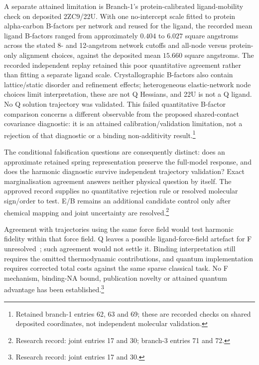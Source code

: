 \documentclass{article}
\begin{document}
A separate attained limitation is Branch-1's protein-calibrated ligand-mobility check on deposited 2ZC9/22U. With one no-intercept scale fitted to protein alpha-carbon B-factors per network and reused for the ligand, the recorded mean ligand B-factors ranged from approximately \(0.404\) to \(6.027\) square angstroms across the stated 8- and 12-angstrom network cutoffs and all-node versus protein-only alignment choices, against the deposited mean \(15.660\) square angstroms. The recorded independent replay retained this poor quantitative agreement rather than fitting a separate ligand scale. Crystallographic B-factors also contain lattice/static disorder and refinement effects; heterogeneous elastic-network node choices limit interpretation, these are not Q Hessians, and 22U is not a Q ligand. No Q solution trajectory was validated. This failed quantitative B-factor comparison concerns a different observable from the proposed shared-contact covariance diagnostic: it is an attained calibration/validation limitation, not a rejection of that diagnostic or a binding non-additivity result.\footnote{Retained branch-1 entries 62, 63 and 69; these are recorded checks on shared deposited coordinates, not independent molecular validation.}

The conditional falsification questions are consequently distinct: does an approximate retained spring representation preserve the full-model response, and does the harmonic diagnostic survive independent trajectory validation? Exact marginalisation agreement answers neither physical question by itself. The approved record supplies no quantitative rejection rule or resolved molecular sign/order to test. E/B remains an additional candidate control only after chemical mapping and joint uncertainty are resolved.\footnote{Research record: joint entries 17 and 30; branch-3 entries 71 and 72.}

Agreement with trajectories using the same force field would test harmonic fidelity within that force field. Q leaves a possible ligand-force-field artefact for F unresolved~\cite{Q}; such agreement would not settle it. Binding interpretation still requires the omitted thermodynamic contributions, and quantum implementation requires corrected total costs against the same sparse classical task. No F mechanism, binding-NA bound, publication novelty or attained quantum advantage has been established.\footnote{Research record: joint entries 17 and 30.}

\clearpage


\end{document}
